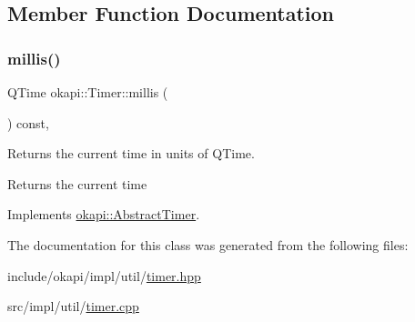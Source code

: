 \subsection{Member Function Documentation}
\mbox{\label{classokapi_1_1Timer_aca51b21d6302021cd24b49b64648c13c}} 
\subsubsection{\texorpdfstring{millis()}{millis()}}
{\footnotesize\ttfamily Q\+Time okapi\+::\+Timer\+::millis (\begin{DoxyParamCaption}{ }\end{DoxyParamCaption}) const\hspace{0.3cm}{\ttfamily [override]}, {\ttfamily [virtual]}}

Returns the current time in units of Q\+Time.

\begin{DoxyReturn}{Returns}
the current time 
\end{DoxyReturn}


Implements \mbox{\hyperlink{classokapi_1_1AbstractTimer_a6871e119f74d8b6a8c928244e837e762}{okapi\+::\+Abstract\+Timer}}.



The documentation for this class was generated from the following files\+:\begin{DoxyCompactItemize}
\item 
include/okapi/impl/util/\mbox{\hyperlink{timer_8hpp}{timer.\+hpp}}\item 
src/impl/util/\mbox{\hyperlink{timer_8cpp}{timer.\+cpp}}\end{DoxyCompactItemize}
